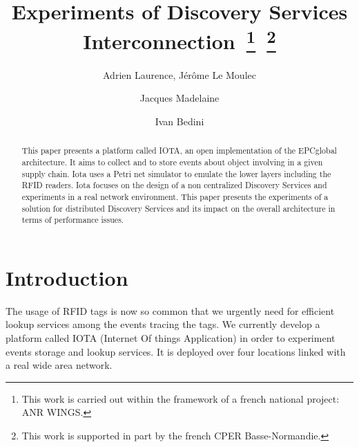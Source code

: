 \documentclass[a4paper]{llncs}
\begin{document}
\pagestyle{empty}

\mainmatter

\title{Experiments of Discovery Services Interconnection~\protect\footnote{This work is
  carried out within the framework of a french national project: ANR
  WINGS.}~\protect\footnote{This work is supported in part by the french CPER Basse-Normandie.}}


\author{Adrien Laurence, J\'{e}r\^{o}me Le Moulec \and Jacques Madelaine \and Ivan Bedini}



\maketitle

\begin{abstract}

This paper presents a platform called IOTA, an open implementation of the
EPCglobal architecture. It aims to collect and to store events about object involving
in a given supply chain.  Iota uses a Petri net simulator to emulate the lower
layers including the RFID readers.  Iota focuses on the design of a non
centralized Discovery Services and experiments in a real network environment.
This paper presents the experiments of a solution for distributed Discovery
Services and its impact on the overall architecture in terms of performance issues.

\end{abstract}

\section{Introduction}

The usage of RFID tags is now so common that we urgently need for efficient
lookup services among the events tracing the tags. We currently develop a
platform called IOTA (Internet Of things Application) in order to experiment
events storage and lookup services. It is deployed over four locations linked
with a real wide area network. 
\end{document}
